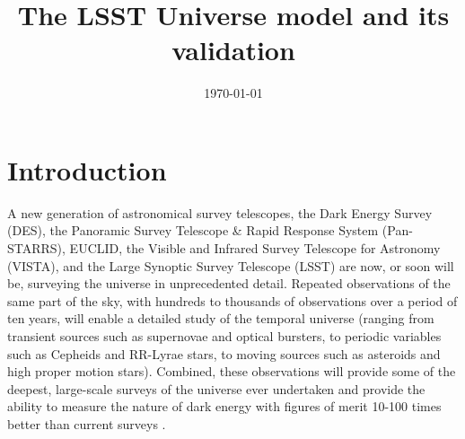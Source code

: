 \documentclass[]{article}
\begin{document}
 

\captionsetup{width=0.8\textwidth}

\title{The LSST Universe model and its validation}


\label{firstpage}

\date{\today}

\maketitle 


 
\section{Introduction \label{sec:intro}}

A new generation of astronomical survey telescopes, the Dark Energy
Survey (DES), the Panoramic Survey Telescope \& Rapid Response System
(Pan-STARRS), EUCLID, the Visible and Infrared Survey Telescope for
Astronomy (VISTA), and the Large Synoptic Survey Telescope (LSST) are
now, or soon will be, surveying the universe in unprecedented
detail. Repeated observations of the same part of the sky, with
hundreds to thousands of observations over a period of ten years, will
enable a detailed study of the temporal universe (ranging from
transient sources such as supernovae and optical bursters, to periodic
variables such as Cepheids and RR-Lyrae stars, to moving sources such
as asteroids and high proper motion stars). Combined, these
observations will provide some of the deepest, large-scale surveys of
the universe ever undertaken and provide the ability to measure the
nature of dark energy with figures of merit 10-100 times better than
current surveys \citep[DETF][]{albrecht06}.
\end{document}
